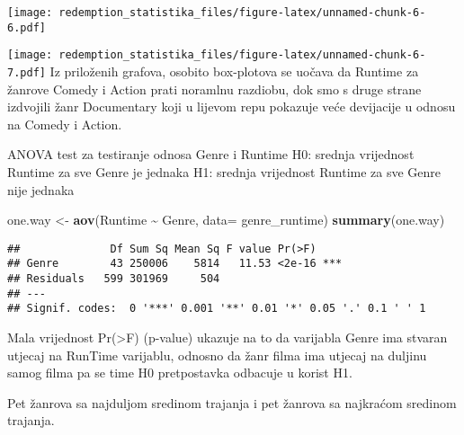 \documentclass[
]{article}
\newenvironment{Shaded}{\begin{snugshade}}{\end{snugshade}}
\newcommand{\AttributeTok}[1]{\textcolor[rgb]{0.13,0.29,0.53}{#1}}
\newcommand{\FunctionTok}[1]{\textcolor[rgb]{0.13,0.29,0.53}{\textbf{#1}}}
\newcommand{\NormalTok}[1]{#1}
\newcommand{\OtherTok}[1]{\textcolor[rgb]{0.56,0.35,0.01}{#1}}
\newcommand{\SpecialCharTok}[1]{\textcolor[rgb]{0.81,0.36,0.00}{\textbf{#1}}}
\newcommand{\StringTok}[1]{\textcolor[rgb]{0.31,0.60,0.02}{#1}}
\begin{document}
\texttt{[image: redemption\_statistika\_files/figure-latex/unnamed-chunk-6-6.pdf]}

\begin{Shaded}
\end{Shaded}

\texttt{[image: redemption\_statistika\_files/figure-latex/unnamed-chunk-6-7.pdf]}
Iz priloženih grafova, osobito box-plotova se uočava da Runtime za
žanrove Comedy i Action prati noramlnu razdiobu, dok smo s druge strane
izdvojili žanr Documentary koji u lijevom repu pokazuje veće devijacije
u odnosu na Comedy i Action.

ANOVA test za testiranje odnosa Genre i Runtime H0: srednja vrijednost
Runtime za sve Genre je jednaka H1: srednja vrijednost Runtime za sve
Genre nije jednaka

\begin{Shaded}
\begin{Highlighting}[]
\NormalTok{one.way }\OtherTok{\textless{}{-}} \FunctionTok{aov}\NormalTok{(Runtime }\SpecialCharTok{\textasciitilde{}}\NormalTok{ Genre, }\AttributeTok{data=}\NormalTok{ genre\_runtime)}
\FunctionTok{summary}\NormalTok{(one.way)}
\end{Highlighting}
\end{Shaded}

\begin{verbatim}
##              Df Sum Sq Mean Sq F value Pr(>F)    
## Genre        43 250006    5814   11.53 <2e-16 ***
## Residuals   599 301969     504                   
## ---
## Signif. codes:  0 '***' 0.001 '**' 0.01 '*' 0.05 '.' 0.1 ' ' 1
\end{verbatim}

Mala vrijednost Pr(\textgreater F) (p-value) ukazuje na to da varijabla
Genre ima stvaran utjecaj na RunTime varijablu, odnosno da žanr filma
ima utjecaj na duljinu samog filma pa se time H0 pretpostavka odbacuje u
korist H1.

Pet žanrova sa najduljom sredinom trajanja i pet žanrova sa najkraćom
sredinom trajanja.
\end{document}
